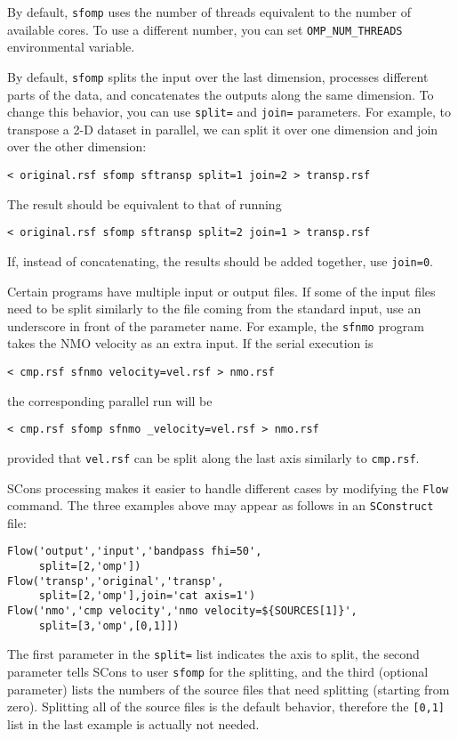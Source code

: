 By default, \texttt{sfomp} uses the number of threads equivalent to
the number of available cores. To use a different number, you can set
\texttt{OMP\_NUM\_THREADS} environmental variable.

By default, \texttt{sfomp} splits the input over the last dimension,
processes different parts of the data, and concatenates the outputs
along the same dimension. To change this behavior, you can use
\texttt{split=} and \texttt{join=} parameters. For example, to
transpose a 2-D dataset in parallel, we can split it over one
dimension and join over the other dimension:
\begin{verbatim}
< original.rsf sfomp sftransp split=1 join=2 > transp.rsf
\end{verbatim}
The result should be equivalent to that of running
\begin{verbatim}
< original.rsf sfomp sftransp split=2 join=1 > transp.rsf
\end{verbatim}
If, instead of concatenating, the results should be added together,
use \texttt{join=0}.

Certain programs have multiple input or output files. If some of the
input files need to be split similarly to the file coming from the
standard input, use an underscore in front of the parameter name. For
example, the \texttt{sfnmo} program takes the NMO velocity as an extra
input. If the serial execution is
\begin{verbatim}
< cmp.rsf sfnmo velocity=vel.rsf > nmo.rsf
\end{verbatim}
the corresponding parallel run will be
\begin{verbatim}
< cmp.rsf sfomp sfnmo _velocity=vel.rsf > nmo.rsf
\end{verbatim}
provided that \texttt{vel.rsf} can be split along the last axis
similarly to \texttt{cmp.rsf}.

SCons processing makes it easier to handle different cases by
modifying the \texttt{Flow} command. The three examples above may
appear as follows in an \texttt{SConstruct} file:

\lstset{language=python,showstringspaces=false,frame=single}
\begin{lstlisting}
Flow('output','input','bandpass fhi=50',
     split=[2,'omp'])
Flow('transp','original','transp',
     split=[2,'omp'],join='cat axis=1')
Flow('nmo','cmp velocity','nmo velocity=${SOURCES[1]}',
     split=[3,'omp',[0,1]])
\end{lstlisting}

The first parameter in the \texttt{split=} list indicates the axis to
split, the second parameter tells SCons to user \texttt{sfomp} for the
splitting, and the third (optional parameter) lists the numbers of the
source files that need splitting (starting from zero). Splitting all
of the source files is the default behavior, therefore the
\texttt{[0,1]} list in the last example is actually not needed.

